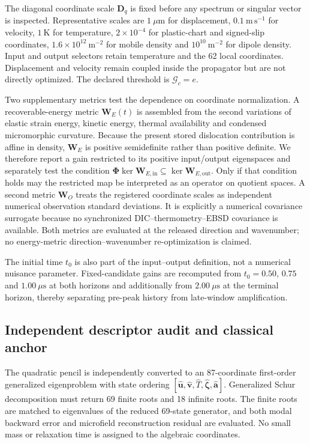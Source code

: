 The diagonal coordinate scale $\boldsymbol D_q$ is fixed before any spectrum or singular vector is inspected. Representative scales are $1~\mu\mathrm m$ for displacement, $0.1~\mathrm{m\,s^{-1}}$ for velocity, $1~\mathrm K$ for temperature, $2\times10^{-4}$ for plastic-chart and signed-slip coordinates, $1.6\times10^{12}~\mathrm{m^{-2}}$ for mobile density and $10^{10}~\mathrm{m^{-2}}$ for dipole density. Input and output selectors retain temperature and the 62 local coordinates. Displacement and velocity remain coupled inside the propagator but are not directly optimized. The declared threshold is $\mathcal G_c=e$.

Two supplementary metrics test the dependence on coordinate normalization. A recoverable-energy metric $\boldsymbol W_E(t)$ is assembled from the second variations of elastic strain energy, kinetic energy, thermal availability and condensed micromorphic curvature. Because the present stored dislocation contribution is affine in density, $\boldsymbol W_E$ is positive semidefinite rather than positive definite.  We therefore report a gain restricted to its positive input/output eigenspaces and separately test the condition $\boldsymbol\Phi\ker\boldsymbol W_{E,\mathrm{in}}\subseteq\ker\boldsymbol W_{E,\mathrm{out}}$.  Only if that condition holds may the restricted map be interpreted as an operator on quotient spaces. A second metric $\boldsymbol W_O$ treats the registered coordinate scales as independent numerical observation standard deviations. It is explicitly a numerical covariance surrogate because no synchronized DIC--thermometry--EBSD covariance is available. Both metrics are evaluated at the released direction and wavenumber; no energy-metric direction--wavenumber re-optimization is claimed.

The initial time $t_0$ is also part of the input--output definition, not a numerical nuisance parameter. Fixed-candidate gains are recomputed from $t_0=0.50$, $0.75$ and $1.00~\mu\mathrm s$ at both horizons and additionally from $2.00~\mu\mathrm s$ at the terminal horizon, thereby separating pre-peak history from late-window amplification.

\subsection{Independent descriptor audit and classical anchor}

The quadratic pencil is independently converted to an 87-coordinate first-order generalized eigenproblem with state ordering $[\widehat{\boldsymbol u},\widehat{\boldsymbol v},\widehat T,\widehat{\boldsymbol\zeta},\widehat{\boldsymbol a}]$. Generalized Schur decomposition must return 69 finite roots and 18 infinite roots. The finite roots are matched to eigenvalues of the reduced 69-state generator, and both modal backward error and microfield reconstruction residual are evaluated. No small mass or relaxation time is assigned to the algebraic coordinates.

